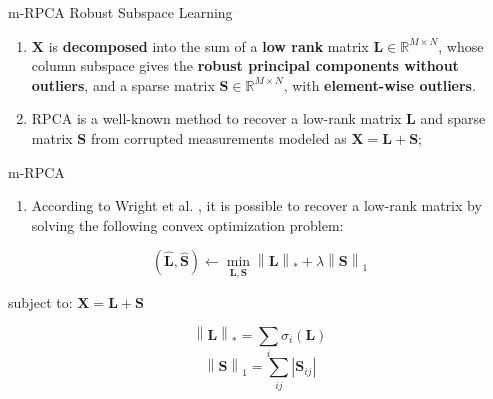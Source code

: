 \documentclass[newPxFont, numfooter, sectionpages]{beamer}
\begin{document}
\begin{frame}[c]{m-RPCA}
    Robust Subspace Learning
	\begin{enumerate}
		\item  $\pmb{X}$ is \textbf{decomposed} into the sum of a \textbf{low rank} matrix $\pmb{L} \in \mathbb{R}^{M \times N}$, whose column subspace gives the \textbf{robust principal components without outliers}, and a sparse matrix $\pmb{S} \in \mathbb{R}^{M \times N}$, with \textbf{element-wise outliers}.
		\item RPCA is a well-known method to recover a low-rank matrix $\pmb{L}$ and sparse matrix $\pmb{S}$ from corrupted measurements modeled as $\pmb{X} = \pmb{L} + \pmb{S}$;
	\end{enumerate}	
\end{frame}

\begin{frame}[c]{m-RPCA}
	\begin{enumerate}
		\item According to Wright et al. \cite{wright2009robust}, it is possible to recover a low-rank matrix by solving the following convex optimization problem:
	\end{enumerate}	
    \begin{equation}\label{eq:4.01}
    	(\hat{\pmb{L}}, \hat{\pmb{S}})\leftarrow \min_{\pmb{L},\pmb{S}}\left \| \pmb{L} \right \|_{*} + \lambda \left \| \pmb{S} \right \|_{1}
    \end{equation}
    \begin{center} subject to: $\pmb{X} = \pmb{L} + \pmb{S}$ \end{center}
    \begin{equation}\label{eq:4.02}
        \left \| \pmb{L} \right \|_{*} = \sum_{i} \sigma_{i}(\pmb{L})
    \end{equation}
    \begin{equation}\label{eq:4.03}
        \left \| \pmb{S} \right \|_{1} = \sum_{ij} \left | \pmb{S}_{ij} \right |
    \end{equation}
\end{frame}

\end{document}
